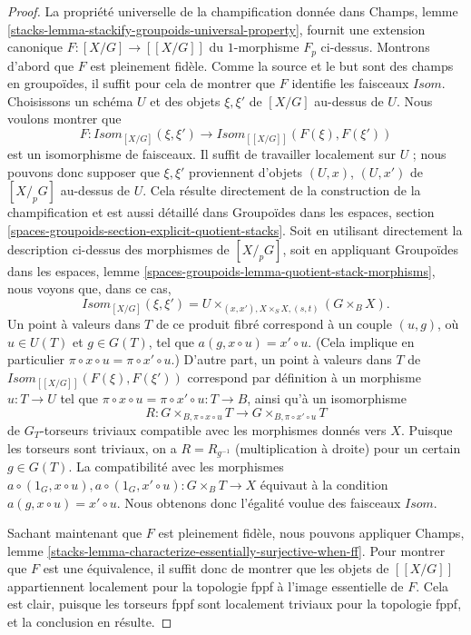\begin{proof}
\medskip\noindent
La propriété universelle de la champification donnée dans
Champs, lemme \ref{stacks-lemma-stackify-groupoids-universal-property},
fournit une extension canonique $F : [X/G] \to [[X/G]]$ du $1$-morphisme
$F_p$ ci-dessus. Montrons d'abord que $F$ est pleinement fidèle.
Comme la source et le but sont des champs en groupoïdes,
il suffit pour cela de montrer que $F$ identifie les faisceaux $\mathit{Isom}$.
Choisissons un schéma $U$ et des objets $\xi, \xi'$ de
$[X/G]$ au-dessus de $U$. Nous voulons montrer que
$$
F :
\mathit{Isom}_{[X/G]}(\xi, \xi')
\longrightarrow
\mathit{Isom}_{[[X/G]]}(F(\xi), F(\xi'))
$$
est un isomorphisme de faisceaux. Il suffit de travailler localement
sur $U$ ; nous pouvons donc supposer que $\xi, \xi'$ proviennent d'objets
$(U, x)$, $(U, x')$ de $[X/_{\!p}G]$ au-dessus de $U$. Cela résulte directement
de la construction de la champification et est aussi détaillé dans
Groupoïdes dans les espaces,
section \ref{spaces-groupoids-section-explicit-quotient-stacks}.
Soit en utilisant directement la description ci-dessus des morphismes de
$[X/_{\!p}G]$, soit en appliquant
Groupoïdes dans les espaces,
lemme \ref{spaces-groupoids-lemma-quotient-stack-morphisms},
nous voyons que, dans ce cas,
$$
\mathit{Isom}_{[X/G]}(\xi, \xi') =
U \times_{(x, x'), X \times_S X, (s, t)} (G \times_B X).
$$
Un point à valeurs dans $T$ de ce produit fibré correspond à un couple
$(u, g)$, où $u \in U(T)$ et $g \in G(T)$, tel que
$a(g, x \circ u) = x' \circ u$. (Cela implique en particulier
$\pi \circ x \circ u = \pi \circ x' \circ u$.)
D'autre part, un point à valeurs dans $T$
de $\mathit{Isom}_{[[X/G]]}(F(\xi), F(\xi'))$ correspond par définition
à un morphisme $u : T \to U$ tel que
$\pi \circ x \circ u = \pi \circ x' \circ u : T \to B$, ainsi qu'à un isomorphisme
$$
R :
G \times_{B, \pi \circ x \circ u} T
\longrightarrow
G \times_{B, \pi \circ x' \circ u} T
$$
de $G_T$-torseurs triviaux compatible avec les morphismes donnés vers $X$.
Puisque les torseurs sont triviaux, on a $R = R_{g^{-1}}$
(multiplication à droite) pour un certain $g \in G(T)$. La compatibilité avec les morphismes
$a \circ (1_G, x \circ u), a \circ (1_G, x' \circ u) : G \times_B T \to X$
équivaut à la condition $a(g, x \circ u) = x' \circ u$.
Nous obtenons donc l'égalité voulue des faisceaux $\mathit{Isom}$.

\medskip\noindent
Sachant maintenant que $F$ est pleinement fidèle, nous pouvons appliquer
Champs, lemme \ref{stacks-lemma-characterize-essentially-surjective-when-ff}.
Pour montrer que $F$ est une équivalence, il suffit donc
de montrer que les objets de $[[X/G]]$ appartiennent localement pour la topologie fppf à l'image essentielle
de $F$. Cela est clair, puisque les torseurs fppf sont localement triviaux pour la topologie fppf,
et la conclusion en résulte.
\end{proof}

